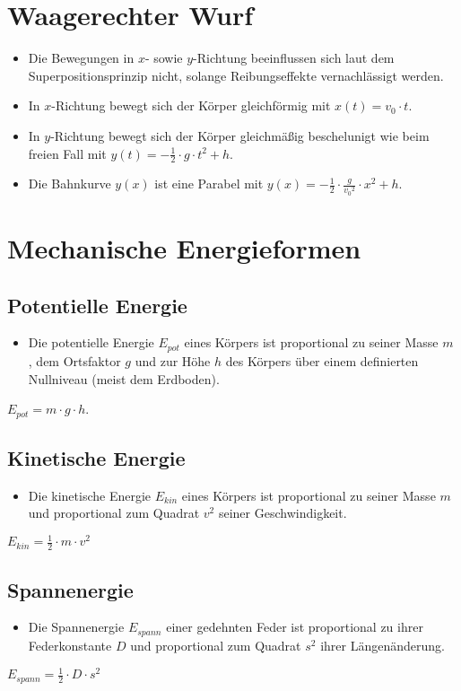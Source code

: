 \documentclass{article}
\begin{document}
\section*{Waagerechter Wurf}
\begin{itemize}
	\item Die Bewegungen in $x$- sowie $y$-Richtung beeinflussen sich laut dem Superpositionsprinzip nicht, solange Reibungseffekte vernachlässigt werden.
	\item In $x$-Richtung bewegt sich der Körper gleichförmig mit $x(t) = v_0 \cdot t$.
	\item In $y$-Richtung bewegt sich der Körper gleichmäßig beschelunigt wie beim freien Fall mit $y(t) = -\frac{1}{2} \cdot g \cdot t^2 + h$.
	\item Die Bahnkurve $y(x)$ ist eine Parabel mit $y(x) = -\frac{1}{2} \cdot \frac{g}{{v_{0}}^2} \cdot x^2 + h$.
\end{itemize}
\section*{Mechanische Energieformen}
\subsection*{Potentielle Energie}
\begin{itemize}
	\item Die potentielle Energie $E_{pot}$ eines Körpers ist proportional zu seiner Masse $m$ , dem Ortsfaktor $g$ und zur Höhe $h$ des Körpers über einem definierten Nullniveau (meist dem Erdboden).
\end{itemize}
\begin{center}
	$E_{pot} = m \cdot g \cdot h$.
\end{center}
\subsection*{Kinetische Energie}
\begin{itemize}
	\item Die kinetische Energie $E_{kin}$ eines Körpers ist proportional zu seiner Masse $m$ und proportional zum Quadrat $v^2$ seiner Geschwindigkeit.
\end{itemize}
\begin{center}
	$E_{kin} = \frac{1}{2} \cdot m \cdot v^2$
\end{center}
\subsection*{Spannenergie}
\begin{itemize}
	\item Die Spannenergie $E_{spann}$ einer gedehnten Feder ist proportional zu ihrer Federkonstante $D$ und proportional zum Quadrat $s^2$ ihrer Längenänderung.
\end{itemize}
\begin{center}
	$E_{spann} = \frac{1}{2} \cdot D \cdot s^2$
\end{center}
\end{document}
